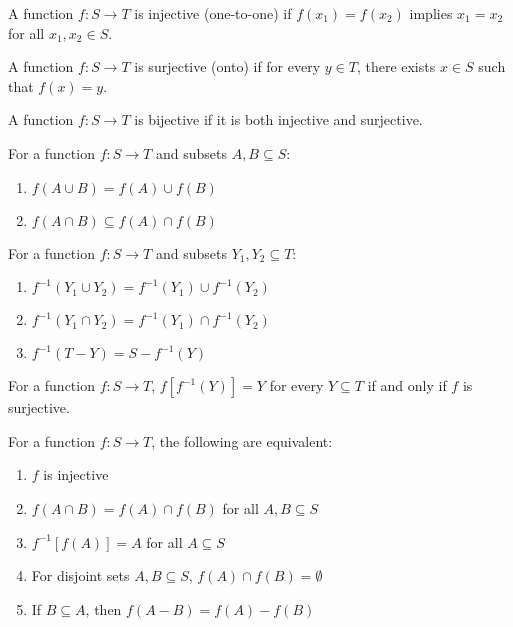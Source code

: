 \begin{definition}
A function $f: S \to T$ is injective (one-to-one) if $f(x_1) = f(x_2)$ implies $x_1 = x_2$ for all $x_1, x_2 \in S$.
\end{definition}

\begin{definition}
A function $f: S \to T$ is surjective (onto) if for every $y \in T$, there exists $x \in S$ such that $f(x) = y$.
\end{definition}

\begin{definition}
A function $f: S \to T$ is bijective if it is both injective and surjective.
\end{definition}

\begin{theorem}
For a function $f: S \to T$ and subsets $A, B \subseteq S$:
\begin{enumerate}
\item $f(A \cup B) = f(A) \cup f(B)$
\item $f(A \cap B) \subseteq f(A) \cap f(B)$
\end{enumerate}
\end{theorem}

\begin{theorem}
For a function $f: S \to T$ and subsets $Y_1, Y_2 \subseteq T$:
\begin{enumerate}
\item $f^{-1}(Y_1 \cup Y_2) = f^{-1}(Y_1) \cup f^{-1}(Y_2)$
\item $f^{-1}(Y_1 \cap Y_2) = f^{-1}(Y_1) \cap f^{-1}(Y_2)$
\item $f^{-1}(T - Y) = S - f^{-1}(Y)$
\end{enumerate}
\end{theorem}

\begin{theorem}
For a function $f: S \to T$, $f[f^{-1}(Y)] = Y$ for every $Y \subseteq T$ if and only if $f$ is surjective.
\end{theorem}

\begin{theorem}
For a function $f: S \to T$, the following are equivalent:
\begin{enumerate}
\item $f$ is injective
\item $f(A \cap B) = f(A) \cap f(B)$ for all $A, B \subseteq S$
\item $f^{-1}[f(A)] = A$ for all $A \subseteq S$
\item For disjoint sets $A, B \subseteq S$, $f(A) \cap f(B) = \emptyset$
\item If $B \subseteq A$, then $f(A - B) = f(A) - f(B)$
\end{enumerate}
\end{theorem}



